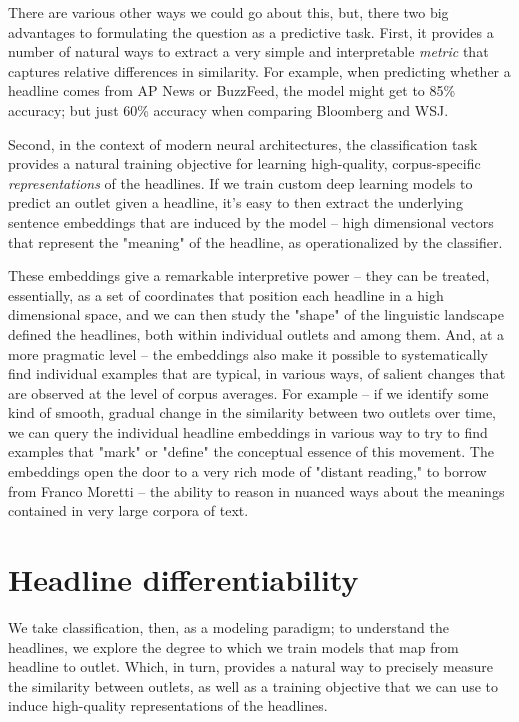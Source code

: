 \documentclass{scrartcl}
\begin{document}
There are various other ways we could go about this, but, there two big advantages to formulating the question as a predictive task. First, it provides a number of natural ways to extract a very simple and interpretable \textit{metric} that captures relative differences in similarity. For example, when predicting whether a headline comes from AP News or BuzzFeed, the model might get to 85\% accuracy; but just 60\% accuracy when comparing Bloomberg and WSJ.

Second, in the context of modern neural architectures, the classification task provides a natural training objective for learning high-quality, corpus-specific \textit{representations} of the headlines. If we train custom deep learning models to predict an outlet given a headline, it's easy to then extract the underlying sentence embeddings that are induced by the model -- high dimensional vectors that represent the "meaning" of the headline, as operationalized by the classifier.

These embeddings give a remarkable interpretive power -- they can be treated, essentially, as a set of coordinates that position each headline in a high dimensional space, and we can then study the "shape" of the linguistic landscape defined the headlines, both within individual outlets and among them. And, at a more pragmatic level -- the embeddings also make it possible to systematically find individual examples that are typical, in various ways, of salient changes that are observed at the level of corpus averages. For example -- if we identify some kind of smooth, gradual change in the similarity between two outlets over time, we can query the individual headline embeddings in various way to try to find examples that "mark" or "define" the conceptual essence of this movement. The embeddings open the door to a very rich mode of "distant reading," to borrow from Franco Moretti -- the ability to reason in nuanced ways about the meanings contained in very large corpora of text.

\section{Headline differentiability}

We take classification, then, as a modeling paradigm; to understand the headlines, we explore the degree to which we train models that map from headline to outlet. Which, in turn, provides a natural way to precisely measure the similarity between outlets, as well as a training objective that we can use to induce high-quality representations of the headlines.
\end{document}
